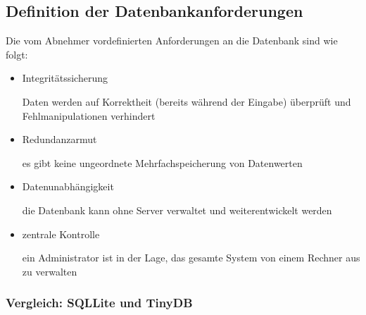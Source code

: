 \documentclass[a4paper,oneside,12pt]{report}
\begin{document}
			\subsection[Definition der Datenbankanforderungen - Johannes Knippel]{Definition der Datenbankanforderungen}
			
				Die vom Abnehmer vordefinierten Anforderungen an die Datenbank sind wie folgt:
				\begin{itemize}
					\item Integritätssicherung\\
					\begin{small}
						Daten werden auf Korrektheit (bereits während der Eingabe) überprüft und Fehlmanipulationen  verhindert 
					\end{small}
					
					\item Redundanzarmut\\
					\begin{small}
						es gibt keine ungeordnete Mehrfachspeicherung von Datenwerten
					\end{small}
								
					\item Datenunabhängigkeit\\
					\begin{small}
						die Datenbank kann ohne Server verwaltet und weiterentwickelt werden
					\end{small} 
					
					\item zentrale Kontrolle\\
					\begin{small}
						ein Administrator ist in der Lage, das gesamte System von einem Rechner aus zu verwalten
					\end{small}
				\end{itemize}
				
				
				\subsubsection[Vergleich: SQLLite und TinyDB - Johannes Knippel]{Vergleich: SQLLite und TinyDB}
				
\end{document}
